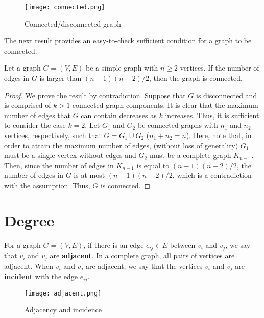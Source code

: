 \documentclass[11pt, A4paper, openany, uplatex]{book}
\begin{document}
\begin{appendices}
\begin{figure}[h!]
	\begin{center}
		\texttt{[image: connected.png]}
		\caption{Connected/disconnected graph\label{fig:connected}}
	\end{center}
\end{figure}

The next result provides an easy-to-check sufficient condition for a graph to be connected.
\begin{proposition}
	Let a graph $G = (V, E)$ be a simple graph with $n \ge 2$ vertices. 
	If the number of edges in $G$ is larger than $(n-1)(n-2)/2$, then the graph is connected.
\end{proposition}

\begin{proof}
	We prove the result by contradiction.
	Suppose that $G$ is disconnected and is comprised of $k > 1$ connected graph components.
	It is clear that the maximum number of edges that $G$ can contain decreases as $k$ increases.
	Thus, it is sufficient to consider the case $k = 2$.
	Let $G_1$ and $G_2$ be connected graphs with $n_1$ and $n_2$ vertices, respectively, such that $G = G_1 \cup G_2$ ($n_1 + n_2 = n$).
	Here, note that, in order to attain the maximum number of edges, (without loss of generality) $G_1$ must be a single vertex without edges and $G_2$ must be a complete graph $K_{n-1}$.
	Then, since the number of edges in $K_{n-1}$ is equal to $(n-1)(n-2)/2$, the number of edges in $G$ is at most $(n-1)(n-2)/2$, which is a contradiction with the assumption.
	Thus, $G$ is connected.
\end{proof}

\section{Degree}

For a graph $G = (V, E)$, if there is an edge $e_{ij} \in E$ between $v_i$ and $v_j$, we say that $v_i$ and $v_j$ are \textbf{adjacent}.
In a complete graph, all pairs of vertices are adjacent.
When $v_i$ and $v_j$ are adjacent, we say that the vertices $v_i$ and  $v_j$ are \textbf{incident} with the edge $e_{ij}$.

\begin{figure}[h!]
	\begin{center}
		\texttt{[image: adjacent.png]}
		\caption{Adjacency and incidence\label{fig:adjacency}}
	\end{center}
\end{figure}


\end{appendices}
\end{document}
